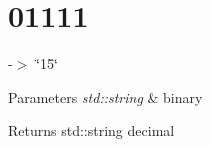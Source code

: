 \hypertarget{01111-example}{}\section{01111}
-\/$>$ \char`\"{}15\char`\"{} 
\begin{DoxyParams}{Parameters}
{\em std\+::string} & binary \\
\hline
\end{DoxyParams}
\begin{DoxyReturn}{Returns}
std\+::string decimal
\end{DoxyReturn}

\begin{DoxyCodeInclude}
\end{DoxyCodeInclude}
 